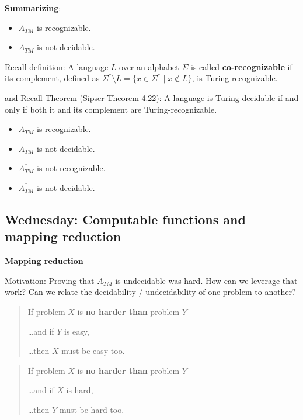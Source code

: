 \documentclass[12pt, oneside]{article}
\begin{document}
\vfill


\newpage

{\bf Summarizing}: 

\begin{itemize}
    \item $A_{TM}$  is recognizable.
    \item $A_{TM}$  is  not  decidable.
\end{itemize}

\vfill

Recall definition: A language $L$ over an  alphabet $\Sigma$ is called {\bf co-recognizable} if its complement,  defined
as $\Sigma^* \setminus L  = \{ x  \in  \Sigma^* \mid x \notin  L \}$, is Turing-recognizable.

and Recall  Theorem (Sipser Theorem 4.22): A  language is Turing-decidable if and only if both  it and its complement
are Turing-recognizable.

\vfill

\begin{itemize}
    \item $A_{TM}$  is recognizable.
    \item $A_{TM}$  is  not  decidable.
    \item $\overline{A_{TM}}$   is  not  recognizable.
    \item $\overline{A_{TM}}$   is  not  decidable.
\end{itemize}

\vfill     
\newpage
\subsection*{Wednesday: Computable functions and mapping reduction}



{\bf Mapping reduction}

Motivation: Proving that $A_{TM}$ is undecidable was hard. How can we leverage that work? 
Can we relate the decidability / undecidability of one problem to another?

\begin{quote}
If problem $X$ is {\bf no harder than} problem $Y$

\ldots and if $Y$ is easy,

\ldots then $X$ must be easy too.
\end{quote}


\begin{quote}
    If problem $X$ is {\bf no harder than} problem $Y$
    
    \ldots and if $X$ is hard,
    
    \ldots then $Y$ must be hard too.
\end{quote}
\end{document}
